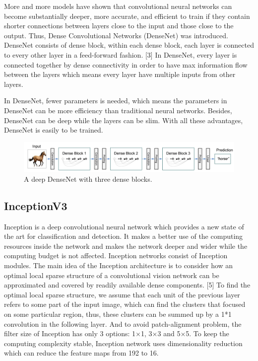 \documentclass{article}
\begin{document}
More and more models have shown that convolutional neural networks can become substantially deeper, more accurate, and efficient to train if they contain shorter connections between layers close to the input and those close to the output. Thus, Dense Convolutional Networks (DenseNet) was introduced. DenseNet consists of dense block, within each dense block, each layer is connected to every other layer in a feed-forward fashion. [3] In DenseNet, every layer is connected together by dense connectivity in order to have max information flow between the layers which means every layer have multiple inputs from other layers. 

In DenseNet, fewer parameters is needed, which means the parameters in DenseNet can be more efficiency than traditional neural networks. Besides, DenseNet can be deep while the layers can be slim. With all these advantages, DenseNet is easily to be trained.

\begin{figure}[H]
	\centering
	\includegraphics[width=0.8\linewidth]{pics/densenet} 
	\caption{A deep DenseNet with three dense blocks.}
\end{figure}



\subsection{InceptionV3}

Inception is a deep convolutional neural network which provides a new state of the art for classification and detection. It makes a better use of the computing resources inside the network and makes the network deeper and wider while the computing budget is not affected. Inception networks consist of Inception modules. The main idea of the Inception architecture is to consider how an optimal local sparse structure of a convolutional vision network can be approximated and covered by readily available dense components. [5] To find the optimal local sparse structure, we assume that each unit of the previous layer refers to some part of the input image, which can find the clusters that focused on some particular region, thus, these clusters can be summed up by a 1*1 convolution in the following layer. And to avoid patch-alignment problem, the filter size of Inception has only 3 options: 1$\times$1, 3$\times$3 and 5$\times$5. To keep the computing complexity stable, Inception network uses dimensionality reduction which can reduce the feature maps from 192 to 16.
\end{document}
